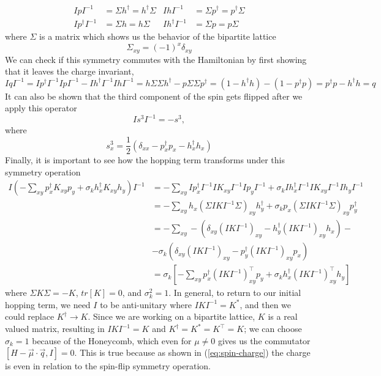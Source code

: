 \begin{align*}
  IpI^{-1} &= \Sigma h^\dagger = h^\dagger \Sigma & IhI^{-1} &= \Sigma p^\dagger = p^\dagger \Sigma \\
  Ip^\dagger I^{-1} &= \Sigma h = h \Sigma & Ih^\dagger I^{-1} &= \Sigma p = p \Sigma
\end{align*}
where $\Sigma$ is a matrix which shows us the behavior of the bipartite lattice
\begin{equation}
  \Sigma_{xy} = (-1)^x\delta_{xy}
\end{equation}
We can check if this symmetry commutes with the Hamiltonian by first showing that it leaves the charge invariant,
\begin{equation}
  IqI^{-1} = Ip^\dagger I^{-1}IpI^{-1} - Ih^\dagger I^{-1}IhI^{-1} = h\Sigma\Sigma h^\dagger - p\Sigma\Sigma p^\dagger = (1 - h^\dagger h) - (1 - p^\dagger p) = p^\dagger p - h^\dagger h = q
  \label{eq:spin-charge}
\end{equation}
It can also be shown that the third component of the spin gets flipped after we apply this operator
\begin{equation}
  Is^3I^{-1} = -s^3,
\end{equation}
where
\begin{equation}
  s^3_x = \frac{1}{2}\left(\delta_{xx} - p^\dagger_x p_x - h^\dagger_x h_x\right)
\end{equation}
Finally, it is important to see how the hopping term transforms under this symmetry operation
\begin{align*}
  I\left( -\sum_{xy} p^\dagger_x K_{xy} p_y + \sigma_k h^\dagger_x K_{xy} h_y\right) I^{-1} &= -\sum_{xy} I p^\dagger_x I^{-1}I K_{xy} I^{-1}I p_y I^{-1} + \sigma_k I h^\dagger_x I^{-1}I K_{xy} I^{-1}I h_y I^{-1}
  \\
  &= -\sum_{xy}  h_x (\Sigma I K I^{-1}\Sigma)_{xy} h^\dagger_y + \sigma_k p_x (\Sigma I K I^{-1}\Sigma)_{xy} p^\dagger_y
  \\
  &= -\sum_{xy} -(\delta_{xy} (I K I^{-1})_{xy} - h^\dagger_y (I K I^{-1})_{xy} h_x) -
  \\
  &- \sigma_k (\delta_{xy} (I K I^{-1})_{xy} - p^\dagger_y (I K I^{-1})_{xy} p_x)
  \\
  &= \sigma_k \left[-\sum_{xy} p^\dagger_x (I K I^{-1})^\top_{xy} p_y + \sigma_k h^\dagger_x (I K I^{-1})^\top_{xy} h_y \right]
\end{align*}
where $\Sigma K \Sigma = -K$, $tr[K] = 0$, and $\sigma^2_k = 1$. In general, to return to our initial hopping term, we need $I$ to be anti-unitary where $IKI^{-1} = K^*$, and then we could replace $K^\dagger\rightarrow K$. Since we are working on a bipartite lattice, $K$ is a real valued matrix, resulting in $IKI^{-1} = K$ and $K^\dagger = K^* = K^\top = K$; we can choose $\sigma_k = 1$ because of the Honeycomb, which even for $\mu \neq 0$ gives us the commutator $[H - \vec{\mu}\cdot\vec{q}, I] = 0$. This is true because as shown in (\cref{eq:spin-charge}) the charge is even in relation to the spin-flip symmetry operation.

